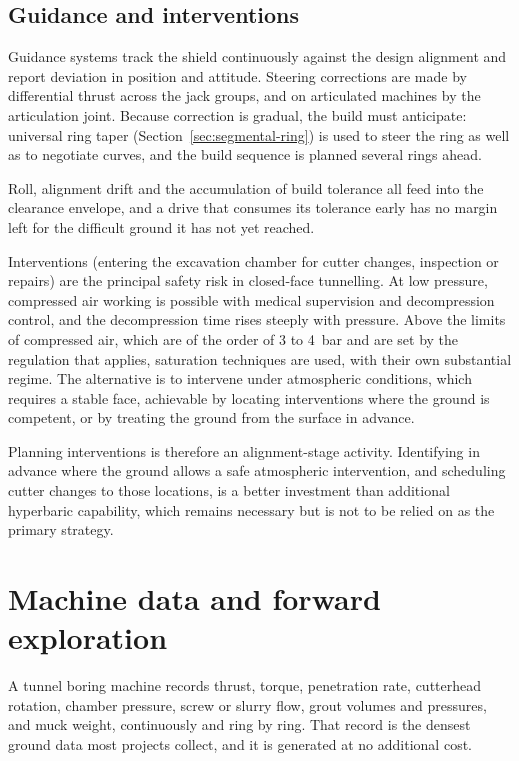 \subsection{Guidance and interventions}
\label{sec:guidance-interventions}

Guidance systems track the shield continuously against the design alignment
and report deviation in position and attitude. Steering corrections are made
by differential thrust across the jack groups, and on articulated machines by
the articulation joint. Because correction is gradual, the build must
anticipate: universal ring taper (Section~\ref{sec:segmental-ring}) is used to
steer the ring as well as to negotiate curves, and the build sequence is planned several rings ahead.

Roll, alignment drift and the accumulation of build tolerance all feed into
the clearance envelope, and a drive that consumes its tolerance early has no
margin left for the difficult ground it has not yet reached.

Interventions (entering the excavation chamber for cutter changes,
inspection or repairs) are the principal safety risk in closed-face
tunnelling. At low pressure, compressed air working is possible with medical
supervision and decompression control, and the decompression time rises
steeply with pressure. Above the limits of compressed air,
which are of the order of 3 to 4~bar and are set by the regulation that
applies,
saturation techniques are used, with their own substantial regime. The
alternative is to intervene under atmospheric conditions, which requires a
stable face, achievable by locating interventions where the ground is
competent, or by treating the ground from the surface in advance.

Planning interventions is therefore an alignment-stage activity. Identifying
in advance where the ground allows a safe atmospheric intervention, and
scheduling cutter changes to those locations, is a better investment than
additional hyperbaric capability, which remains necessary but is not to be
relied on as the primary strategy.

\section{Machine data and forward exploration}
\label{sec:machine-data}

A tunnel boring machine records thrust, torque, penetration rate, cutterhead
rotation, chamber pressure, screw or slurry flow, grout volumes and pressures,
and muck weight, continuously and ring by ring. That record is the densest
ground data most projects collect, and it is generated at no additional cost.

